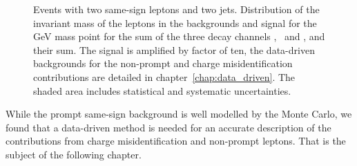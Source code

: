 \begin{figure}[htb]
    \caption{Events with two same-sign leptons and two jets. Distribution of the invariant mass of the leptons in the backgrounds and
        signal for the \unit[550]{GeV} mass point for the sum of the three
        decay channels \E\E, \E\M\ and \M\M, and their sum. The signal is
    amplified by factor of ten, the data-driven backgrounds for the
non-prompt and charge misidentification contributions are detailed in
chapter~\ref{chap:data_driven}. The shaded area includes statistical and
systematic uncertainties.}
    \label{fig:lep_mass}
\end{figure}

While the prompt same-sign background is well modelled by the Monte Carlo, we
found that a data-driven method is needed for an accurate description of the
contributions from charge misidentification and non-prompt leptons.
That is the subject of the following chapter.
